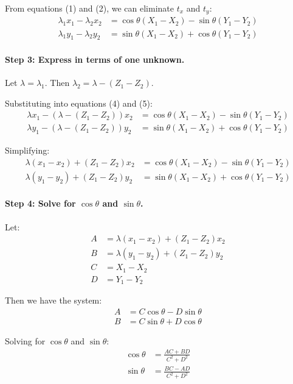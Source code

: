 \documentclass[12pt]{article}
\begin{document}
From equations (1) and (2), we can eliminate $t_x$ and $t_y$:
\begin{align}
\lambda_1 x_1 - \lambda_2 x_2 &= \cos\theta(X_1 - X_2) - \sin\theta(Y_1 - Y_2) \\
\lambda_1 y_1 - \lambda_2 y_2 &= \sin\theta(X_1 - X_2) + \cos\theta(Y_1 - Y_2)
\end{align}

\paragraph{Step 3: Express in terms of one unknown.}
Let $\lambda = \lambda_1$. Then $\lambda_2 = \lambda - (Z_1 - Z_2)$.

Substituting into equations (4) and (5):
\begin{align}
\lambda x_1 - (\lambda - (Z_1 - Z_2))x_2 &= \cos\theta(X_1 - X_2) - \sin\theta(Y_1 - Y_2) \\
\lambda y_1 - (\lambda - (Z_1 - Z_2))y_2 &= \sin\theta(X_1 - X_2) + \cos\theta(Y_1 - Y_2)
\end{align}

Simplifying:
\begin{align}
\lambda(x_1 - x_2) + (Z_1 - Z_2)x_2 &= \cos\theta(X_1 - X_2) - \sin\theta(Y_1 - Y_2) \\
\lambda(y_1 - y_2) + (Z_1 - Z_2)y_2 &= \sin\theta(X_1 - X_2) + \cos\theta(Y_1 - Y_2)
\end{align}

\paragraph{Step 4: Solve for $\cos\theta$ and $\sin\theta$.}
Let:
\begin{align}
A &= \lambda(x_1 - x_2) + (Z_1 - Z_2)x_2 \\
B &= \lambda(y_1 - y_2) + (Z_1 - Z_2)y_2 \\
C &= X_1 - X_2 \\
D &= Y_1 - Y_2
\end{align}

Then we have the system:
\begin{align}
A &= C\cos\theta - D\sin\theta \\
B &= C\sin\theta + D\cos\theta
\end{align}

Solving for $\cos\theta$ and $\sin\theta$:
\begin{align}
\cos\theta &= \frac{AC + BD}{C^2 + D^2} \\
\sin\theta &= \frac{BC - AD}{C^2 + D^2}
\end{align}
\end{document}

